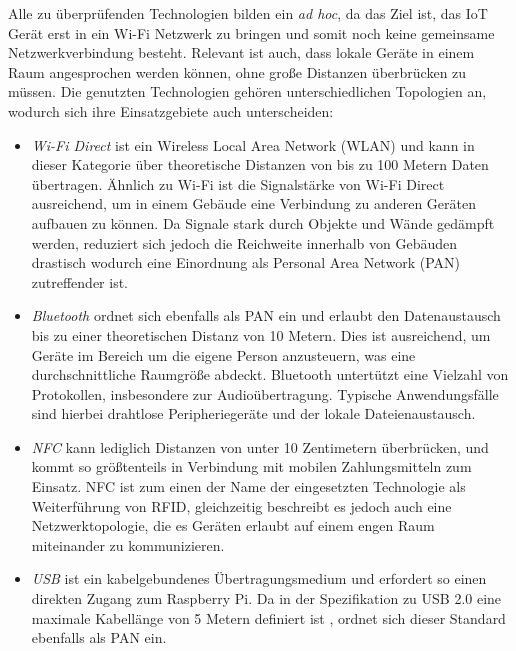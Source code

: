     Alle zu überprüfenden Technologien bilden ein {\it ad hoc}, da das Ziel ist, das IoT Gerät erst in ein Wi-Fi Netzwerk zu bringen und somit noch keine gemeinsame Netzwerkverbindung besteht. Relevant ist auch, dass lokale Geräte in einem Raum angesprochen werden können, ohne große Distanzen überbrücken zu müssen. Die genutzten Technologien gehören unterschiedlichen Topologien an, wodurch sich ihre Einsatzgebiete auch unterscheiden:
    \begin{itemize}
    \item {\it Wi-Fi Direct} ist ein Wireless Local Area Network (WLAN) und kann in dieser Kategorie über theoretische Distanzen von bis zu 100 Metern Daten übertragen. Ähnlich zu Wi-Fi ist die Signalstärke von Wi-Fi Direct ausreichend, um in einem Gebäude eine Verbindung zu anderen Geräten aufbauen zu können. Da Signale stark durch Objekte und Wände gedämpft werden, reduziert sich jedoch die Reichweite innerhalb von Gebäuden drastisch wodurch eine Einordnung als Personal Area Network (PAN) zutreffender ist.
    
    \item {\it Bluetooth} ordnet sich ebenfalls als PAN ein und erlaubt den Datenaustausch bis zu einer theoretischen Distanz von 10 Metern. Dies ist ausreichend, um Geräte im Bereich um die eigene Person anzusteuern, was eine durchschnittliche Raumgröße abdeckt. Bluetooth untertützt eine Vielzahl von Protokollen, insbesondere zur Audioübertragung. Typische Anwendungsfälle sind hierbei drahtlose Peripheriegeräte und der lokale Dateienaustausch.
    
    \item {\it NFC} kann lediglich Distanzen von unter 10 Zentimetern überbrücken, und kommt so größtenteils in Verbindung mit mobilen Zahlungsmitteln zum Einsatz. NFC ist zum einen der Name der eingesetzten Technologie als Weiterführung von RFID, gleichzeitig beschreibt es jedoch auch eine Netzwerktopologie, die es Geräten erlaubt auf einem engen Raum miteinander zu kommunizieren. 
    
    \item {\it USB} ist ein kabelgebundenes Übertragungsmedium und erfordert so einen direkten Zugang zum Raspberry Pi. Da in der Spezifikation zu USB 2.0 eine maximale Kabellänge von 5 Metern definiert ist \cite{usbSpec}, ordnet sich dieser Standard ebenfalls als PAN ein.
    
    \end{itemize}
